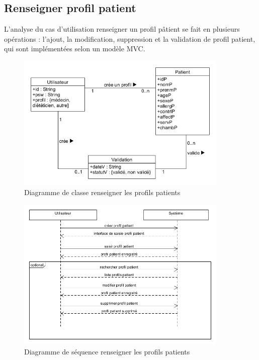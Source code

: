 \subsection{Renseigner profil patient}

L'analyse du cas d'utilisation renseigner un profil pâtient se fait en plusieurs opérations : l'ajout, la modification, suppression et la validation de profil patient, qui sont implémentées selon un modèle MVC.

\begin{figure}
  \label{diagramme-renseigner-les-profils-patients}
  \centering
  \includegraphics[width=0.9\textwidth]{../../CasDUtilisations/ProfilPatient/diagclassProfilPatient.png}
  \caption{Diagramme de classe renseigner les profils patients}
\end{figure}


\begin{figure}
  \label{diagramme-renseigner-les-profils-patients}
  \centering
  \includegraphics[width=0.9\textwidth]{../../CasDUtilisations/ProfilPatient/diagseqProfilPatient.png}
  \caption{Diagramme de séquence renseigner les profils patients}
\end{figure}

